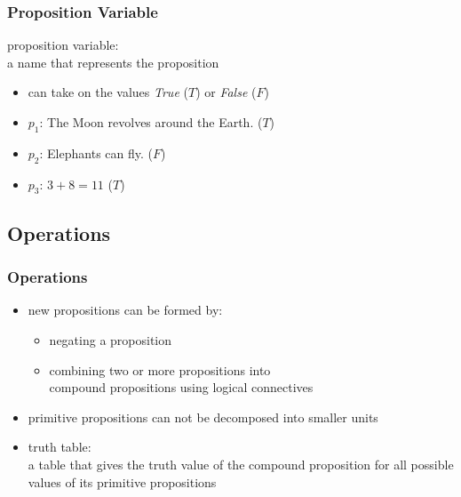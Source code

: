 \documentclass[dvipsnames]{beamer}
\begin{document}
\begin{frame}
  \frametitle{Proposition Variable}

  \begin{definition}
    \alert{proposition variable}:\\
      a name that represents the proposition

    \begin{itemize}
      \item can take on the values \emph {True} ($T$) or \emph{False} ($F$)
    \end{itemize}
  \end{definition}

  \pause
  \begin{example}
    \begin{itemize}
      \item $p_1$: The Moon revolves around the Earth. ($T$)
      \item $p_2$: Elephants can fly. ($F$)
      \item $p_3$: $3+8=11$ ($T$)
    \end{itemize}
  \end{example}
\end{frame}

\subsection{Operations}

\begin{frame}
  \frametitle{Operations}

  \begin{itemize}
    \item new propositions can be formed by:
    \begin{itemize}
      \item negating a proposition
      \item combining two or more propositions into\\
        \alert{compound propositions} using \alert{logical connectives}
    \end{itemize}
    \item \alert{primitive propositions} can not be decomposed into smaller
      units
  \end{itemize}

  \pause
  \begin{itemize}
    \item \alert{truth table}:\\
      a table that gives the truth value of the compound proposition for all
      possible values of its primitive propositions
  \end{itemize}
\end{frame}
\end{document}
